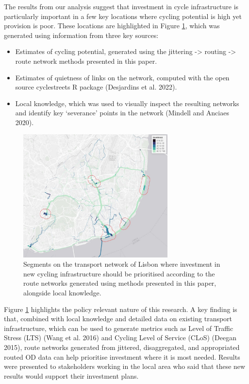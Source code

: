 \documentclass{isprs} %
\providecommand{\tightlist}{%
  \setlength{\itemsep}{0pt}\setlength{\parskip}{0pt}}
\begin{document}
The results from our analysis suggest that investment in cycle infrastructure is particularly important in a few key locations where cycling potential is high yet provision is poor.
These locations are highlighted in Figure \ref{fig:segments}, which was generated using information from three key sources:

\begin{itemize}
\tightlist
\item
  Estimates of cycling potential, generated using the jittering -\textgreater{} routing -\textgreater{} route network methods presented in this paper.
\item
  Estimates of quietness of links on the network, computed with the open source cyclestreets R package (Desjardins et al. 2022).
\item
  Local knowledge, which was used to visually inspect the resulting networks and identify key `severance' points in the network (Mindell and Anciaes 2020).
\end{itemize}

\begin{figure}
  \includegraphics[width=0.7\textwidth]{figures/priority-segments}
  \centering 
  \caption{Segments on the transport network of Lisbon where investment in new cycling infrastructure should be prioritised according to the route networks generated using methods presented in this paper, alongside local knowledge.}
  \label{fig:segments}
\end{figure}

Figure \ref{fig:segments} highlights the policy relevant nature of this research.
A key finding is that, combined with local knowledge and detailed data on existing transport infrastructure, which can be used to generate metrics such as Level of Traffic Stress (LTS) (Wang et al. 2016) and Cycling Level of Service (CLoS) (Deegan 2015), route networks generated from jittered, disaggregated, and appropriated routed OD data can help prioritise investment where it is most needed.
Results were presented to stakeholders working in the local area who said that these new results would support their investment plans.
\end{document}
